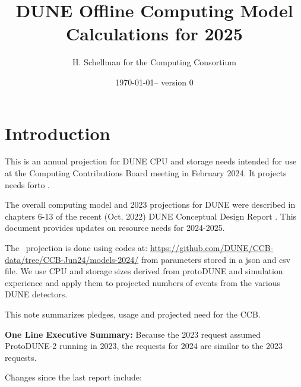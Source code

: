 \documentclass[12pt]{article}
\title{DUNE Offline Computing Model Calculations for 2025}
\author{H. Schellman for the Computing Consortium}
\date{\today -- version 0}
\newcommand{\csvautotabularright}[2][]{\csvloop{autotabularright={#2},#1}}
\begin{document}
\makeatletter

\maketitle



\section{Introduction}

This is an annual projection for DUNE CPU and storage needs intended for use at the Computing Contributions Board meeting in February 2024. It projects needs for\configRequestYear to \configMaxYear. 

The overall computing model  and 2023 projections for DUNE were described in chapters 6-13 of the recent (Oct. 2022) DUNE Conceptual Design Report \cite{DUNE:2022fcw}.   This document provides updates on resource needs for 2024-2025. 

The \configRequestYear\ projection is done using codes at: \href{https://github.com/DUNE/CCB-data/tree/CCB-Jun24/models-2024/}{https://github.com/DUNE/CCB-data/tree/CCB-Jun24/models-2024/} from parameters stored in a json and csv file. We use CPU and storage sizes derived from protoDUNE and simulation experience and apply them to projected numbers of events from the various DUNE detectors. 

This note summarizes pledges, usage and projected need for the CCB.

{\bf One Line Executive Summary:} Because the 2023 request assumed ProtoDUNE-2 running in 2023, the requests for 2024 are similar to the 2023 requests.





Changes since the last report \cite{CCB2023Report, CCB2023Minutes} include:
\end{document}
